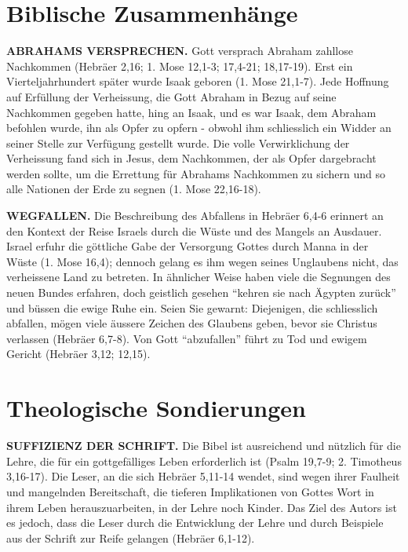 \documentclass[]{krantz}
\begin{document}
\section{Biblische Zusammenhänge}\label{biblische-zusammenhuxe4nge-4}

\textbf{ABRAHAMS VERSPRECHEN.} Gott versprach Abraham zahllose
Nachkommen (Hebräer 2,16; 1. Mose 12,1-3; 17,4-21; 18,17-19). Erst ein
Vierteljahrhundert später wurde Isaak geboren (1. Mose 21,1-7). Jede
Hoffnung auf Erfüllung der Verheissung, die Gott Abraham in Bezug auf
seine Nachkommen gegeben hatte, hing an Isaak, und es war Isaak, dem
Abraham befohlen wurde, ihn als Opfer zu opfern - obwohl ihm
schliesslich ein Widder an seiner Stelle zur Verfügung gestellt wurde.
Die volle Verwirklichung der Verheissung fand sich in Jesus, dem
Nachkommen, der als Opfer dargebracht werden sollte, um die Errettung
für Abrahams Nachkommen zu sichern und so alle Nationen der Erde zu
segnen (1. Mose 22,16-18).

\textbf{WEGFALLEN.} Die Beschreibung des Abfallens in Hebräer 6,4-6
erinnert an den Kontext der Reise Israels durch die Wüste und des
Mangels an Ausdauer. Israel erfuhr die göttliche Gabe der Versorgung
Gottes durch Manna in der Wüste (1. Mose 16,4); dennoch gelang es ihm
wegen seines Unglaubens nicht, das verheissene Land zu betreten. In
ähnlicher Weise haben viele die Segnungen des neuen Bundes erfahren,
doch geistlich gesehen ``kehren sie nach Ägypten zurück'' und büssen die
ewige Ruhe ein. Seien Sie gewarnt: Diejenigen, die schliesslich
abfallen, mögen viele äussere Zeichen des Glaubens geben, bevor sie
Christus verlassen (Hebräer 6,7-8). Von Gott ``abzufallen'' führt zu Tod
und ewigem Gericht (Hebräer 3,12; 12,15).

\section{Theologische Sondierungen}\label{theologische-sondierungen-2}

\textbf{SUFFIZIENZ DER SCHRIFT.} Die Bibel ist ausreichend und nützlich
für die Lehre, die für ein gottgefälliges Leben erforderlich ist (Psalm
19,7-9; 2. Timotheus 3,16-17). Die Leser, an die sich Hebräer 5,11-14
wendet, sind wegen ihrer Faulheit und mangelnden Bereitschaft, die
tieferen Implikationen von Gottes Wort in ihrem Leben herauszuarbeiten,
in der Lehre noch Kinder. Das Ziel des Autors ist es jedoch, dass die
Leser durch die Entwicklung der Lehre und durch Beispiele aus der
Schrift zur Reife gelangen (Hebräer 6,1-12).
\end{document}
